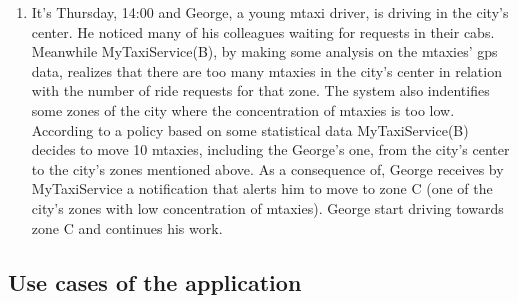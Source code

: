 \documentclass[11pt,titlepage]{article} %
\begin{document}
\begin{enumerate}
	    \item It's Thursday, 14:00 and George, a young mtaxi driver, is driving in the city's center.
	       He noticed many of his colleagues waiting for requests in their cabs.
	       Meanwhile MyTaxiService(B), by making some analysis on the mtaxies' gps data, realizes that there are too many mtaxies
	       in the city's center in relation with the number of ride requests for that zone. The system also indentifies
	       some zones of the city where the concentration of mtaxies is too low. According to a policy based on some statistical data
	       MyTaxiService(B) decides to move 10 mtaxies, including the George's one, from the city's center to the city's zones mentioned above.
	       As a consequence of, George receives by MyTaxiService a notification that alerts him to move to zone C (one of the city's zones
	       with low concentration of mtaxies). George start driving towards zone C and continues his work.
	\end{enumerate}
	\newpage

    \subsection{Use cases of the application}
\end{document}
